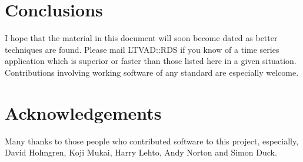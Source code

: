 \section{Conclusions}
I hope that the material in this document will soon become dated
as better techniques are found. Please mail LTVAD::RDS if you 
know of a time series application which is superior or faster than 
those listed here in a given situation. Contributions involving
working software of any standard are especially welcome.

\section{Acknowledgements}
Many thanks to those people who contributed software to this
project, especially, David Holmgren, Koji Mukai, Harry Lehto,
Andy Norton and Simon Duck.






